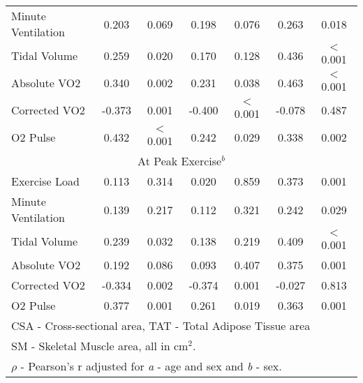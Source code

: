 \begin{table}[p]
\begin{tabular}{|l | c c | c c | c c|}
		Minute Ventilation & 0.203  & 0.069            & 0.198  & 0.076            & 0.263  & 0.018                \\
		Tidal Volume       & 0.259  & 0.020            & 0.170  & 0.128            & 0.436  & $<$0.001             \\
		Absolute VO2       & 0.340  & 0.002            & 0.231  & 0.038            & 0.463  & $<$0.001             \\
		Corrected VO2      & -0.373 & 0.001            & -0.400 & $<$0.001         & -0.078 & 0.487                \\
		O2 Pulse           & 0.432  & $<$0.001         & 0.242  & 0.029            & 0.338  & 0.002                \\ \hline
		\multicolumn{7}{|c|}{At Peak Exercise$^b$}                                                                 \\ \hline
		Exercise Load      & 0.113  & 0.314            & 0.020  & 0.859            & 0.373  & 0.001                \\
		Minute Ventilation & 0.139  & 0.217            & 0.112  & 0.321            & 0.242  & 0.029                \\
		Tidal Volume       & 0.239  & 0.032            & 0.138  & 0.219            & 0.409  & $<$0.001             \\
		Absolute VO2       & 0.192  & 0.086            & 0.093  & 0.407            & 0.375  & 0.001                \\
		Corrected VO2      & -0.334 & 0.002            & -0.374 & 0.001            & -0.027 & 0.813                \\
		O2 Pulse           & 0.377  & 0.001            & 0.261  & 0.019            & 0.363  & 0.001                \\ \hline
		\multicolumn{7}{l}{CSA - Cross-sectional area, TAT - Total Adipose Tissue area}                            \\
		\multicolumn{7}{l}{SM - Skeletal Muscle area, all in cm$^2$.}                                              \\
		\multicolumn{7}{l}{$\rho$ - Pearson's r adjusted for \textit{a} - age and sex and \textit{b} - sex.}
	\end{tabular}
\end{table}